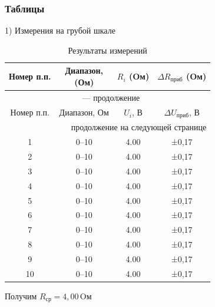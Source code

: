 \documentclass[14pt,a4paper]{extarticle}
\begin{document}
\subsubsection*{Таблицы}
1) Измерения на грубой шкале
{\small

\setlength{\tabcolsep}{4pt}  %
\begin{longtable}{|c|c|c|c|}
\caption{Результаты измерений}
\label{tab:resul}\\
\hline
Номер п.п. & \makecell{Диапазон,\\(Ом)} & \makecell{\(R_i\)\\(Oм)} & \makecell{\(\Delta R_{\text{приб}}\)\\(Oм)} \\
\hline
\endfirsthead

\multicolumn{4}{c}{{\tablename\ \thetable{} — продолжение}} \\
\hline
Номер п.п. & Диапазон, Ом & \(U_i\), В & \(\Delta U_{\text{приб}}\), В \\
\hline
\endhead

\hline
\multicolumn{4}{|r|}{продолжение на следующей странице} \\
\endfoot

\hline
\endlastfoot

1  & 0–10 & 4.00 & ±0,17 \\
2  & 0–10 & 4.00 & ±0,17 \\
3  & 0–10 & 4.00 & ±0,17 \\
4  & 0–10 & 4.00 & ±0,17 \\
5  & 0–10 & 4.00 & ±0,17 \\
6  & 0–10 & 4.00 & ±0,17 \\
7  & 0–10 & 4.00 & ±0,17 \\
8  & 0–10 & 4.00 & ±0,17 \\
9  & 0–10 & 4.00 & ±0,17 \\
10 & 0–10 & 4.00 & ±0,17\\

\end{longtable}
}
Получим \( R_{\text{ср}} = 4,00 \, \text{Oм} \)
\end{document}
